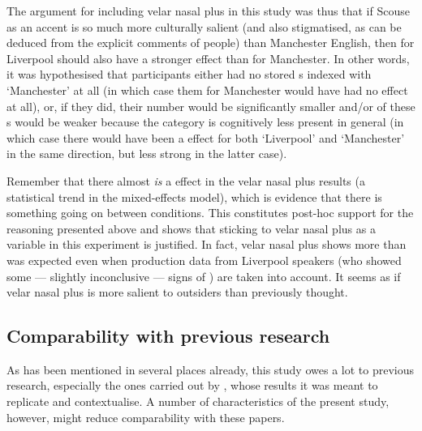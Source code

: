 The argument for including velar nasal plus in this study was thus that if Scouse as an accent is so much more culturally salient (and also stigmatised, as can be deduced from the explicit comments of people) than Manchester English, then  for Liverpool should also have a stronger effect than  for Manchester.
In other words, it was hypothesised that participants either had no stored s indexed with `Manchester' at all (in which case  them for Manchester would have had no effect at all), or, if they did, their number would be significantly smaller and/or  of these s would be weaker because the category is cognitively less present in general (in which case there would have been a  effect for both `Liverpool' and `Manchester' in the same direction, but less strong in the latter case).

Remember that there almost \emph{is} a  effect in the velar nasal plus results (a statistical trend in the mixed-effects model), which is evidence that there is something going on between  conditions.
This constitutes post-hoc support for the reasoning presented above and shows that sticking to velar nasal plus as a variable in this experiment is justified.
In fact, velar nasal plus shows more  than was expected even when production data from Liverpool speakers (who showed some --- slightly inconclusive --- signs of ) are taken into account.
It seems as if velar nasal plus is more salient to outsiders than previously thought.

		\subsection{Comparability with previous research}

As has been mentioned in several places already, this study owes a lot to previous research, especially the ones carried out by \textcite{niedzielski1999,hayetal2006a,hayetal2006b,haydrager2010}, whose results it was meant to replicate and contextualise.
A number of characteristics of the present study, however, might reduce comparability with these papers.

